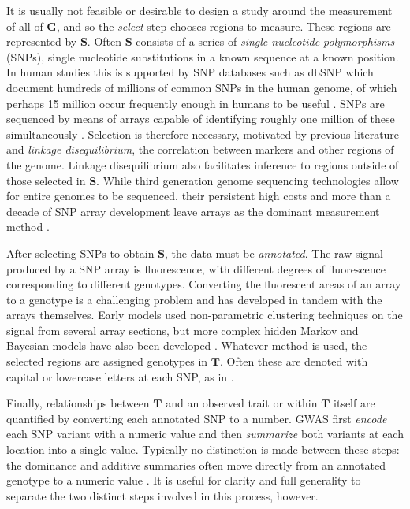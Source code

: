 \documentclass[sts]{imsart}
\newcommand{\m}[1]{\mathbf{#1}}               %
\begin{document}
It is usually not feasible or desirable to design a study around the measurement of all of $\m{G}$, and so the \emph{select} step chooses regions to measure. These regions are represented by $\m{S}$. Often $\m{S}$ consists of a series of \emph{single nucleotide polymorphisms} (SNPs), single nucleotide substitutions in a known sequence at a known position. In human studies this is supported by SNP databases such as dbSNP \cite{NCBIdbSNP} which document hundreds of millions of common SNPs in the human genome, of which perhaps 15 million occur frequently enough in humans to be useful \cite{koboldtetal2013next}. SNPs are sequenced by means of arrays capable of identifying roughly one million of these simultaneously \cite{laframboise2009, tametal2019benefits}. Selection is therefore necessary, motivated by previous literature and \emph{linkage disequilibrium}, the correlation between markers and other regions of the genome. Linkage disequilibrium also facilitates inference to regions outside of those selected in $\m{S}$. While third generation genome sequencing technologies allow for entire genomes to be sequenced, their persistent high costs and more than a decade of SNP array development leave arrays as the dominant measurement method \cite{heatherchain2016sequencers, hasinetal2017multi, uffelmannetal2021gwas}.

After selecting SNPs to obtain $\m{S}$, the data must be \emph{annotated}. The raw signal produced by a SNP array is fluorescence, with different degrees of fluorescence corresponding to different genotypes. Converting the fluorescent areas of an array to a genotype is a challenging problem and has developed in tandem with the arrays themselves. Early models used non-parametric clustering techniques on the signal from several array sections, but more complex hidden Markov and Bayesian models have also been developed \cite{laframboise2009}. Whatever method is used, the selected regions are assigned genotypes in $\m{T}$. Often these are denoted with capital or lowercase letters at each SNP, as in \cite{siegmundyakir2007, visschergoddard2019}.

Finally, relationships between $\m{T}$ and an observed trait or within $\m{T}$ itself are quantified by converting each annotated SNP to a number. GWAS first \emph{encode} each SNP variant with a numeric value and then \emph{summarize} both variants at each location into a single value. Typically no distinction is made between these steps: the dominance and additive summaries often move directly from an annotated genotype to a numeric value \cite{LanderBotstein1989, cheverud2001, siegmundyakir2007}. It is useful for clarity and full generality to separate the two distinct steps involved in this process, however.
\end{document}
